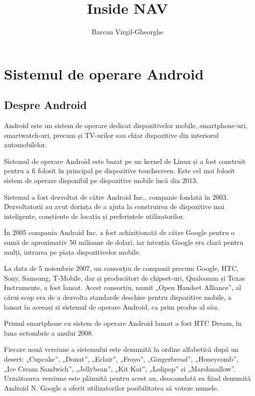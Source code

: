 \documentclass[12pt,a4paper]{article}
\title{Inside NAV}
\author{Barcan Virgil-Gheorghe}
\begin{document}
\maketitle

\tableofcontents

\newpage
\section{Sistemul de operare Android}
\subsection{Despre Android \cite{AndroidHistoryAndroidCentral}} 
Android este un sistem de operare dedicat dispozitivelor mobile, smartphone-uri, smartwatch-uri, precum și TV-urilor sau chiar dispozitive din interiorul automobilelor.

Sistemul de operare Android este bazat pe un kernel de Linux și a fost construit pentru a fi folosit în principal pe dispozitive touchscreen. Este cel mai folosit sistem de operare disponibil pe dispozitive mobile încă din 2013.

Sistemul a fost dezvoltat de către Android Inc., companie fondată în 2003. Dezvoltatorii au avut dorința de a ajuta la construirea de dispozitive mai inteligente, conștiente de locația și preferințele utilizatorilor.

În 2005 compania Android Inc. a fost achiziționată de către Google pentru o sumă de aproximativ 50 milioane de dolari, iar intenția Google era clară pentru mulți, intrarea pe piața dispozitivelor mobile.

La data de 5 noiembrie 2007, un consorțiu de companii precum Google, HTC, Sony, Samsung, T-Mobile, dar și producători de chipset-uri, Qualcomm și Texas Instruments, a fost lansat. Acest consorțiu, numit „Open Handset Alliance”, al cărui scop era de a dezvolta standarde deschise pentru dispozitive mobile, a lansat în aceeași zi sistemul de operare Android, ca prim produs al său.

Primul smartphone cu sistem de operare Android lansat a fost HTC Dream, în luna octombrie a anului 2008.

Fiecare nouă versiune a sistemului este denumită în ordine alfabetică după un desert: „Cupcake”, „Donut”, „Eclair”, „Froyo”, „Gingerbread”, „Honeycomb”, „Ice Cream Sandwich”, „Jellybean”, „Kit Kat”, „Lolipop” și „Marshmallow”. Următoarea versiune este plănuită pentru acest an, deocamdată ea fiind denumită Android N. Google a oferit utilizatorilor posibilitatea să voteze numele.
\end{document}
